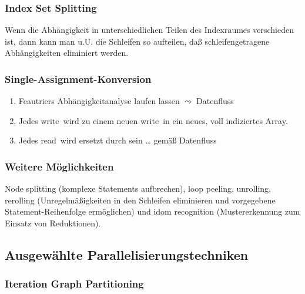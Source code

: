\subsubsection{Index Set Splitting}

Wenn die Abhängigkeit in unterschiedlichen Teilen des Indexraumes
verschieden ist, dann kann man u.U. die Schleifen so aufteilen, daß
schleifengetragene Abhängigkeiten eliminiert werden.

\subsubsection{Single-Assignment-Konversion}

\begin{enumerate}
	\item Feautriers Abhängigkeitanalyse laufen lassen  \( \leadsto \) \glqq Datenfluss\grqq
	\item Jedes \glqq write\grqq\ wird zu einem neuen \glqq write\grqq\ in ein neues, voll indiziertes Array.
	\item Jedes \glqq read\grqq\ wird ersetzt durch sein \dots %
	gemäß Datenfluss
\end{enumerate}

\subsubsection{Weitere Möglichkeiten}

Node splitting (komplexe Statements aufbrechen), loop peeling,
unrolling, rerolling (Unregelmäßigkeiten in den Schleifen eliminieren
und vorgegebene Statement-Reihenfolge ermöglichen) und idom recognition
(Mustererkennung zum Einsatz von Reduktionen).


\def\ins{\hspace{.5cm}}



\subsection{Ausgewählte Parallelisierungstechniken}


\subsubsection{Iteration Graph Partitioning}
\label{sec:igp}

